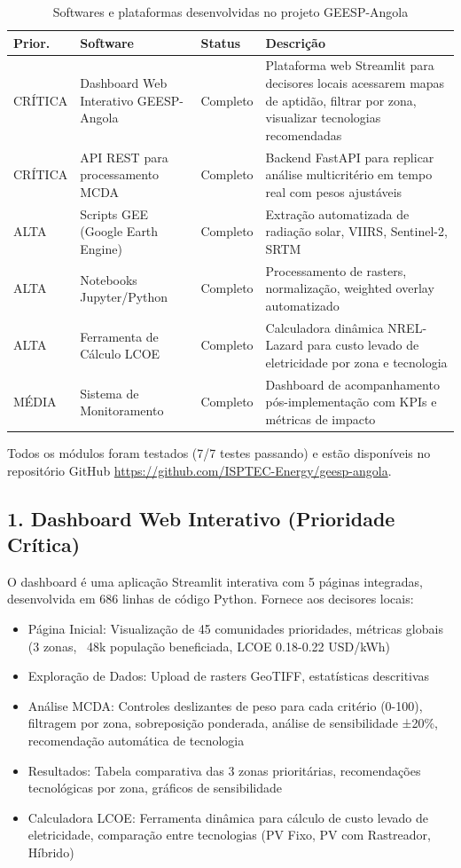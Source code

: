 \documentclass[12pt, a4paper]{article}
\begin{document}
\begin{table}[H]
\centering
\small
\caption{Softwares e plataformas desenvolvidas no projeto GEESP-Angola}
\label{tab:softwares}
\begin{tabular}{|l|l|l|p{5.5cm}|}
\hline
\textbf{Prior.} & \textbf{Software} & \textbf{Status} & \textbf{Descrição} \\
\hline
CRÍTICA & Dashboard Web Interativo GEESP-Angola & Completo & Plataforma web Streamlit para decisores locais acessarem mapas de aptidão, filtrar por zona, visualizar tecnologias recomendadas \\
\hline
CRÍTICA & API REST para processamento MCDA & Completo & Backend FastAPI para replicar análise multicritério em tempo real com pesos ajustáveis \\
\hline
ALTA & Scripts GEE (Google Earth Engine) & Completo & Extração automatizada de radiação solar, VIIRS, Sentinel-2, SRTM \\
\hline
ALTA & Notebooks Jupyter/Python & Completo & Processamento de rasters, normalização, weighted overlay automatizado \\
\hline
ALTA & Ferramenta de Cálculo LCOE & Completo & Calculadora dinâmica NREL-Lazard para custo levado de eletricidade por zona e tecnologia \\
\hline
MÉDIA & Sistema de Monitoramento & Completo & Dashboard de acompanhamento pós-implementação com KPIs e métricas de impacto \\
\hline
\end{tabular}
\end{table}

Todos os módulos foram testados (7/7 testes passando) e estão disponíveis no repositório GitHub \url{https://github.com/ISPTEC-Energy/geesp-angola}.

\subsection{1. Dashboard Web Interativo (Prioridade Crítica)}

O dashboard é uma aplicação Streamlit interativa com 5 páginas integradas, desenvolvida em 686 linhas de código Python. Fornece aos decisores locais:

\begin{itemize}
    \item Página Inicial: Visualização de 45 comunidades prioridades, métricas globais (3 zonas, ~48k população beneficiada, LCOE 0.18-0.22 USD/kWh)
    \item Exploração de Dados: Upload de rasters GeoTIFF, estatísticas descritivas
    \item Análise MCDA: Controles deslizantes de peso para cada critério (0-100), filtragem por zona, sobreposição ponderada, análise de sensibilidade ±20\%, recomendação automática de tecnologia
    \item Resultados: Tabela comparativa das 3 zonas prioritárias, recomendações tecnológicas por zona, gráficos de sensibilidade
    \item Calculadora LCOE: Ferramenta dinâmica para cálculo de custo levado de eletricidade, comparação entre tecnologias (PV Fixo, PV com Rastreador, Híbrido)
\end{itemize}
\end{document}
